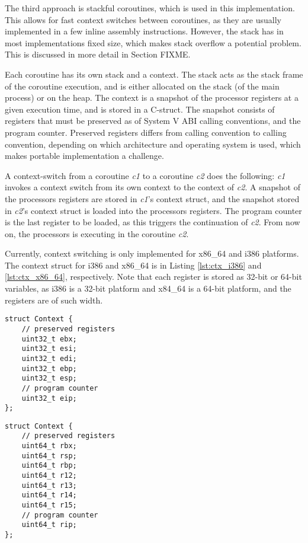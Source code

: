 The third approach is stackful coroutines, which is used in this implementation. This allows for fast context switches between coroutines, as they are usually implemented in a few inline assembly instructions. However, the stack has in most implementations fixed size, which makes stack overflow a potential problem. This is discussed in more detail in Section FIXME. 

Each coroutine has its own stack and a context. The stack acts as the stack frame of the coroutine execution, and is either allocated on the stack (of the main process) or on the heap. The context is a snapshot of the processor registers at a given execution time, and is stored in a C\hyp{}struct. The snapshot consists of registers that must be preserved as of System V ABI calling conventions, and the program counter. Preserved registers differs from calling convention to calling convention, depending on which architecture and operating system is used, which makes portable implementation a challenge.  

A context\hyp{}switch from a coroutine \textit{c1} to a coroutine \textit{c2} does the following: \textit{c1} invokes a context switch from its own context to the context of \textit{c2}. A snapshot of the processors registers are stored in \textit{c1}'s context struct, and the snapshot stored in \textit{c2}'s context struct is loaded into the processors registers. The program counter is the last register to be loaded, as this triggers the continuation of \textit{c2}. From now on, the processors is executing in the coroutine \textit{c2}.

Currently, context switching is only implemented for x86\_64 and i386 platforms. The context struct for i386 and x86\_64 is in Listing \ref{lst:ctx_i386} and \ref{lst:ctx_x86_64}, respectively. Note that each register is stored as 32\hyp{}bit or 64\hyp{}bit variables, as i386 is a 32\hyp{}bit platform and x84\_64 is a 64\hyp{}bit platform, and the registers are of such width.

\noindent\begin{minipage}{.45\textwidth}
\begin{lstlisting}[caption={Context struct for i386},style={CustomC},label={lst:ctx_i386}]
struct Context {
    // preserved registers
    uint32_t ebx;  
    uint32_t esi;
    uint32_t edi;
    uint32_t ebp;
    uint32_t esp;
    // program counter
    uint32_t eip;
};
\end{lstlisting}
\end{minipage}\hfill
\begin{minipage}{.45\textwidth}
\begin{lstlisting}[caption={Context struct for x86\_64},style={CustomC},label={lst:ctx_x86_64}]
struct Context {
    // preserved registers
    uint64_t rbx;  
    uint64_t rsp;
    uint64_t rbp;
    uint64_t r12;
    uint64_t r13;
    uint64_t r14;
    uint64_t r15;
    // program counter
    uint64_t rip;
};
\end{lstlisting}
\end{minipage}

